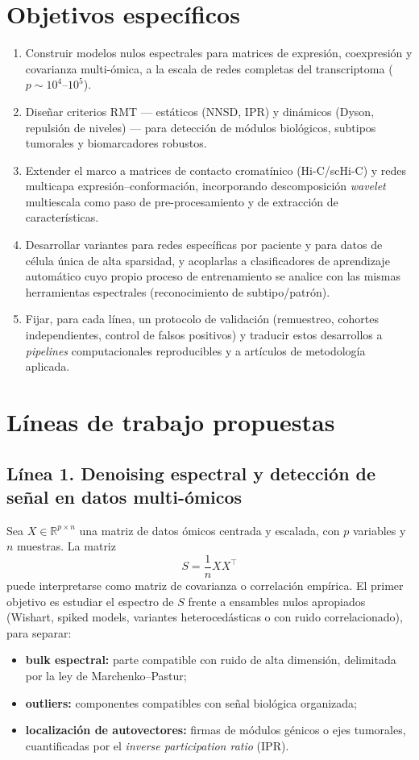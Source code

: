 \documentclass[11pt]{article}
\begin{document}
\section{Objetivos específicos}
\begin{enumerate}[label=\arabic*.]
    \item Construir modelos nulos espectrales para matrices de expresión, coexpresión y covarianza multi-ómica, a la escala de redes completas del transcriptoma (\(p\sim 10^4\)--\(10^5\)).
    \item Diseñar criterios RMT --- estáticos (NNSD, IPR) y dinámicos (Dyson, repulsión de niveles) --- para detección de módulos biológicos, subtipos tumorales y biomarcadores robustos.
    \item Extender el marco a matrices de contacto cromatínico (Hi-C/scHi-C) y redes multicapa expresión--conformación, incorporando descomposición \emph{wavelet} multiescala como paso de pre-procesamiento y de extracción de características.
    \item Desarrollar variantes para redes específicas por paciente y para datos de célula única de alta sparsidad, y acoplarlas a clasificadores de aprendizaje automático cuyo propio proceso de entrenamiento se analice con las mismas herramientas espectrales (reconocimiento de subtipo/patrón).
    \item Fijar, para cada línea, un protocolo de validación (remuestreo, cohortes independientes, control de falsos positivos) y traducir estos desarrollos a \emph{pipelines} computacionales reproducibles y a artículos de metodología aplicada.
\end{enumerate}

\section{Líneas de trabajo propuestas}

\subsection{Línea 1. Denoising espectral y detección de señal en datos multi-ómicos}
Sea $X \in \mathbb{R}^{p\times n}$ una matriz de datos ómicos centrada y escalada, con $p$ variables y $n$ muestras. La matriz
\[
S=\frac{1}{n}XX^{\top}
\]
puede interpretarse como matriz de covarianza o correlación empírica. El primer objetivo es estudiar el espectro de $S$ frente a ensambles nulos apropiados (Wishart, spiked models, variantes heterocedásticas o con ruido correlacionado), para separar:
\begin{itemize}
    \item \textbf{bulk espectral:} parte compatible con ruido de alta dimensión, delimitada por la ley de Marchenko--Pastur;
    \item \textbf{outliers:} componentes compatibles con señal biológica organizada;
    \item \textbf{localización de autovectores:} firmas de módulos génicos o ejes tumorales, cuantificadas por el \emph{inverse participation ratio} (IPR).
\end{itemize}
\end{document}
